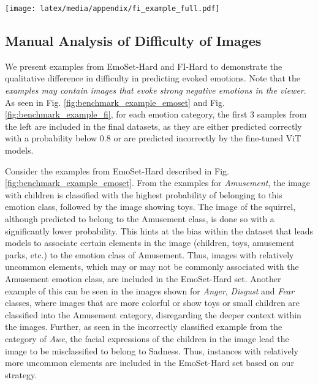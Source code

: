 \begin{figure*}
    \centerline{
    \texttt{[image: latex/media/appendix/fi\_example\_full.pdf]}}
    \caption{Examples from the created \textbf{FI-Hard} dataset. Similar to EmoSet-Hard, for Contentment and Sadness, no instances are found that are predicted correctly with a probability less than 0.8. For all other categories, the two leftmost examples describe instances that are correctly predicted, but with a probability less than 0.8. The next example shows an image predicted incorrectly. Finally, the rightmost example for all categories show the correctly predicted samples, which have probability of prediction higher than 0.8.}
    \label{fig:benchmark_example_fi}
\end{figure*}

\subsection{Manual Analysis of Difficulty of Images}
\label{app:benchmark_difficulty}

We present examples from EmoSet-Hard and FI-Hard to demonstrate the qualitative difference in difficulty in predicting evoked emotions. Note that the \textit{examples may contain images that evoke strong negative emotions in the viewer}. As seen in Fig. \ref{fig:benchmark_example_emoset} and Fig. \ref{fig:benchmark_example_fi}, for each emotion category, the first 3 samples from the left are included in the final datasets, as they are either predicted correctly with a probability below 0.8 or are predicted incorrectly by the fine-tuned ViT models. 

Consider the examples from EmoSet-Hard described in Fig. \ref{fig:benchmark_example_emoset}. From the examples for \textit{Amusement}, the image with children is classified with the highest probability of belonging to this emotion class, followed by the image showing toys. The image of the squirrel, although predicted to belong to the Amusement class, is done so with a significantly lower probability. This hints at the bias within the dataset that leads models to associate certain elements in the image (children, toys, amusement parks, etc.) to the emotion class of Amusement. Thus, images with relatively uncommon elements, which may or may not be commonly associated with the Amusement emotion class, are included in the EmoSet-Hard set.
Another example of this can be seen in the images shown for \textit{Anger}, \textit{Disgust} and \textit{Fear} classes, where images that are more colorful or show toys or small children are classified into the Amusement category, disregarding the deeper context within the images. Further, as seen in the incorrectly classified example from the category of \textit{Awe}, the facial expressions of the children in the image lead the image to be misclassified to belong to Sadness. Thus, instances with relatively more uncommon elements are included in the EmoSet-Hard set based on our strategy. 

